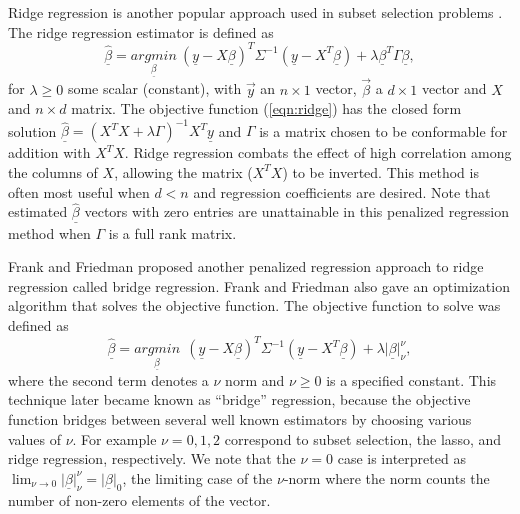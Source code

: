  Ridge regression is another popular approach used in subset selection problems \cite{hoerl1970ridge}. The ridge regression estimator is defined as 
 \begin{equation}\label{eqn:ridge}
 \underline{\hat{\beta}}= \underset{\underline{\beta}}{argmin}\ (\underline{y} -X\underline{\beta})^T\Sigma^{-1}(\underline{y} -X^T\underline{\beta}) + \lambda\underline{\beta}^T\Gamma\underline{\beta},
 \end{equation}
for $\lambda\geq 0$ some scalar (constant), with $\vec{y}$ an $n \times 1$ vector, $\vec{\beta}$ a $d\times 1$ vector and $X$ and $n \times d $ matrix. The objective function (\ref{eqn:ridge}) has the closed form solution $\underline{\hat{\beta}} = (X^TX+\lambda\Gamma)^{-1}X^T\underline{y}$ and $\Gamma$ is a matrix chosen to be conformable for addition with $X^TX$. Ridge regression combats the effect of high correlation among the columns of $X$, allowing the matrix ($X^TX$) to be inverted. This method is often most useful when $d<n$ and regression coefficients are desired. Note that estimated $\hat{\underline{\beta}}$ vectors with zero entries are unattainable in this penalized regression method when $\Gamma$ is a full rank matrix.
 
 Frank and Friedman \cite{lldiko1993statistical} proposed another penalized regression approach to ridge regression called bridge regression. Frank and Friedman also gave an optimization algorithm that solves the objective function. 
 The objective function to solve was defined as
 \begin{equation}
\hat{\underline{\beta}}= \underset{\underline{\beta}}{argmin}\ \ (\underline{y} -X\underline{\beta})^T\Sigma^{-1}(\underline{y} -X^T\underline{\beta}) + \lambda\vert\underline{\beta}\vert_{\nu}^{\nu},
  \end{equation}  
where the second term denotes a $\nu$ norm  and $\nu \geq 0$ is a specified constant. This technique later became known as ``bridge'' regression, because the objective function bridges between several well known estimators by choosing various values of $\nu$. For example $\nu = 0,1,2$ correspond to subset selection, the lasso, and ridge regression, respectively. We note that the $\nu=0$ case is interpreted as $\lim_{\nu\to0}\vert\underline{\beta}\vert_{\nu}^{\nu} = \vert\underline{\beta}\vert_0$, the limiting case of the $\nu$-norm where the norm counts the number of non-zero elements of the vector. 
 
